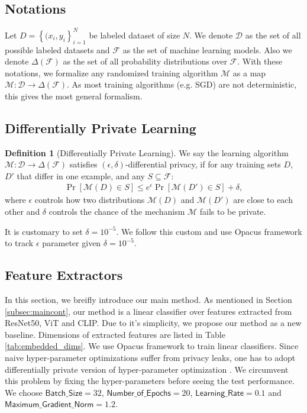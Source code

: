 \documentclass{article}
\newcommand{\Dd}{\mathcal{D}}
\newcommand{\Ff}{\mathcal{F}}
\newcommand{\Mm}{\mathcal{M}}
\theoremstyle{definition}
\newtheorem{definition}{Definition}[section]
\begin{document}
\subsection{Notations}
\label{sec:not}
Let $D=\left\{(x_i,y_i\right\}_{i=1}^N$ be labeled dataset of size $N$. We denote $\Dd$ as the set of all possible labeled datasets and $\Ff$ as the set of machine learning models. Also we denote $\Delta(\Ff)$ as the set of all probability distributions over $\Ff$. With these notations, we formalize any randomized training algorithm $\Mm$ as a map $\Mm:\Dd\rightarrow\Delta(\Ff)$. As most training algorithms (e.g. SGD) are not deterministic, this gives the most general formalism.

\subsection{Differentially Private Learning}
\label{subsec:dp}
\begin{definition}[Differentially Private Learning] We say the learning algorithm $\Mm:\Dd\rightarrow\Delta(\Ff)$ satisfies $(\epsilon, \delta)$-differential privacy, if for any training sets $D$, $D'$ that differ in one example, and any $S\subseteq\Ff$: 
\begin{align}
    \Pr\left[\Mm(D)\in S \right]\leq e^\epsilon \Pr\left[\Mm(D')\in S\right]+\delta,
\end{align}
where $\epsilon$ controls how two distributions $\Mm(D)$ and $\Mm(D')$ are close to each other and $\delta$ controls the chance of the mechanism $\Mm$ fails to be private.
\label{def:dp}
\end{definition}
It is customary to set $\delta=10^{-5}$. We follow this custom and use Opacus framework\cite{yousefpour2021opacus} to track $\epsilon$ parameter given $\delta=10^{-5}$.

\subsection{Feature Extractors}
\label{subsec:featext}
In this section, we breifly introduce our main method. As mentioned in Section \ref{subsec:maincont}, our method is a linear classifier over features extracted from ResNet50, ViT and CLIP. Due to it's simplicity, we propose our method as a new baseline. Dimensions of extracted features are listed in Table \ref{tab:embedded_dims}. We use Opacus framework to train linear classifiers. Since naive hyper-parameter optimizations suffer from privacy leaks, one has to adopt differentially private version of hyper-parameter optimization \cite{liu2019private, priyanshu2021efficient}. We circumvent this problem by fixing the hyper-parameters before seeing the test performance. We choose $\textsf{Batch\_Size}=32$, $\textsf{Number\_of\_Epochs}=20$, $\textsf{Learning\_Rate}=0.1$ and $\textsf{Maximum\_Gradient\_Norm}=1.2$.
\end{document}
